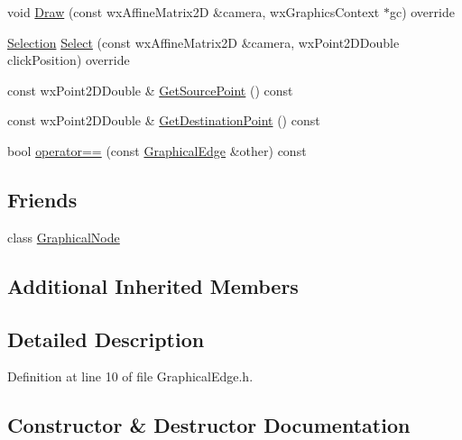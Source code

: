 \begin{DoxyCompactItemize}
\item 
void \hyperlink{class_graphical_edge_a48170a7fc9e86d92985d694addca8837}{Draw} (const wx\+Affine\+Matrix2D \&camera, wx\+Graphics\+Context $\ast$gc) override
\item 
\hyperlink{struct_selection}{Selection} \hyperlink{class_graphical_edge_aa2dbc33d5177ce3aad84f39ba97921de}{Select} (const wx\+Affine\+Matrix2D \&camera, wx\+Point2\+D\+Double click\+Position) override
\item 
const wx\+Point2\+D\+Double \& \hyperlink{class_graphical_edge_af8738fa9de63d51bec94fae3bebbe4ac}{Get\+Source\+Point} () const
\item 
const wx\+Point2\+D\+Double \& \hyperlink{class_graphical_edge_aaf19f4b4688b5eb5df39be7af1d09b4b}{Get\+Destination\+Point} () const
\item 
bool \hyperlink{class_graphical_edge_aa03597dca35cc2f08c8a1894657546d8}{operator==} (const \hyperlink{class_graphical_edge}{Graphical\+Edge} \&other) const
\end{DoxyCompactItemize}
\subsection*{Friends}
\begin{DoxyCompactItemize}
\item 
class \hyperlink{class_graphical_edge_adc7790177f80355fce81568dcdbf561e}{Graphical\+Node}
\end{DoxyCompactItemize}
\subsection*{Additional Inherited Members}


\subsection{Detailed Description}


Definition at line 10 of file Graphical\+Edge.\+h.



\subsection{Constructor \& Destructor Documentation}
\mbox{\label{class_graphical_edge_a9325712366dcec2f70457f66b19bb04d}} 
